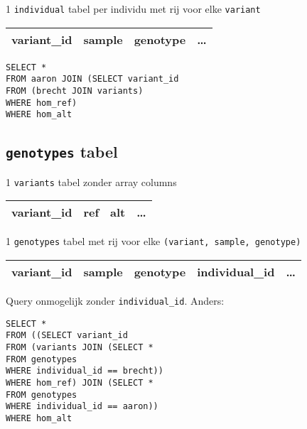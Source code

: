 \documentclass{article}
\begin{document}
1 \texttt{individual} tabel per individu met rij voor elke \texttt{variant}

\begin{table}[!htbp]
\begin{tabular}{@{}|l|l|l|l|@{}}
\toprule
variant\_id & sample & genotype & \ldots \\ \bottomrule
\end{tabular}
\end{table}

\begin{tabbing}
\texttt{SELECT *}
\\\texttt{FROM aaron JOIN (}\=\texttt{SELECT variant\_id}
\\ \> \texttt{FROM (brecht JOIN variants)}
\\ \> \texttt{WHERE hom\_ref) }
\\ \texttt{WHERE hom\_alt }
\end{tabbing}

\newpage
\subsection{\texttt{genotypes} tabel}

1 \texttt{variants} tabel zonder array columns

\begin{table}[!htbp]
\begin{tabular}{@{}|l|l|l|l|@{}}
\toprule
variant\_id & ref & alt & \ldots \\ \bottomrule
\end{tabular}
\end{table}

1 \texttt{genotypes} tabel met rij voor elke \texttt{(variant, sample, genotype)}

\begin{table}[!htbp]
\begin{tabular}{@{}|l|l|l|l|l|@{}}
\toprule
variant\_id & sample & genotype & \color{red} individual\_id & \ldots \\ \bottomrule
\end{tabular}
\end{table}

Query onmogelijk zonder \texttt{individual\_id}. Anders:\\

\begin{tabbing}
\texttt{SELECT *} 
\\\texttt{FROM ((}\=\texttt{SELECT variant\_id }
\\ \> \texttt{FROM (variants JOIN (}\=\texttt{SELECT * }
\\ \>\>\texttt{FROM genotypes }
\\ \>\>\texttt{WHERE individual\_id == brecht)) }
\\ \> \texttt{WHERE hom\_ref) JOIN (}\=\= \texttt{SELECT * }
					\\ \>\>\> \texttt{FROM genotypes }
					\\ \>\>\> \texttt{WHERE individual\_id == aaron))}
\\ \texttt{WHERE hom\_alt}

\end{tabbing}
\end{document}
